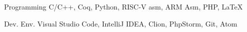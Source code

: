 

\begin{cvskills}

  \cvskill
  {Programming} %
  {C/C++, Coq, Python, RISC-V asm, ARM Asm, PHP, \LaTeX} %

  \cvskill
  {Dev. Env.} %
  {Visual Studio Code, IntelliJ IDEA, Clion, PhpStorm, Git, Atom} %

\end{cvskills}
